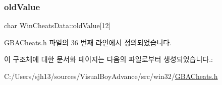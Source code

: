 \mbox{\label{struct_win_cheats_data_a62b624b83f4613d5753d49b4c9fcf0f1}} 
\subsubsection{\texorpdfstring{old\+Value}{oldValue}}
{\footnotesize\ttfamily char Win\+Cheats\+Data\+::old\+Value\mbox{[}12\mbox{]}}



G\+B\+A\+Cheats.\+h 파일의 36 번째 라인에서 정의되었습니다.



이 구조체에 대한 문서화 페이지는 다음의 파일로부터 생성되었습니다.\+:\begin{DoxyCompactItemize}
\item 
C\+:/\+Users/sjh13/sources/\+Visual\+Boy\+Advance/src/win32/\mbox{\hyperlink{_g_b_a_cheats_8h}{G\+B\+A\+Cheats.\+h}}\end{DoxyCompactItemize}

